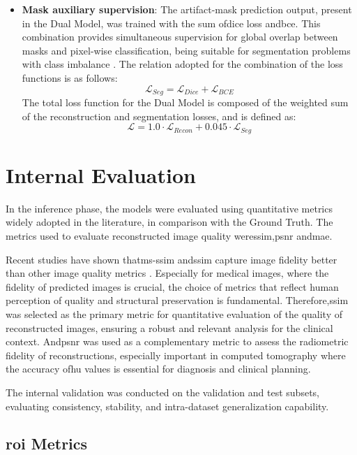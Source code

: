 \begin{itemize}
    \item \textbf{Mask auxiliary supervision}: The artifact-mask prediction output, present in the Dual Model, was trained with the sum of\acrfull{dice} loss and\acrfull{bce}. This combination provides simultaneous supervision for global overlap between masks and pixel-wise classification, being suitable for segmentation problems with class imbalance \cite{taghanakiComboLossHandling2021}.
     The relation adopted for the combination of the loss functions is as follows:
        \[
        \mathcal{L}_{Seg} = \mathcal{L}_{Dice} + \mathcal{L}_{BCE}
        \]
     The total loss function for the Dual Model is composed of the weighted sum of the reconstruction and segmentation losses, and is defined as:
        \[
        \mathcal{L} = 1{.}0 \cdot \mathcal{L}_{Recon} + 0{.}045 \cdot \mathcal{L}_{Seg}
        \]
\end{itemize}

\section{Internal Evaluation}
In the inference phase, the models were evaluated using quantitative metrics widely adopted in the literature, in comparison with the Ground Truth. The metrics used to evaluate reconstructed image quality were\acrshort{ssim},\acrshort{psnr} and\acrshort{mae}.

Recent studies have shown that\acrshort{ms-ssim} and\acrshort{ssim} capture image fidelity better than other image quality metrics \cite{linzhangFSIMFeatureSimilarity2011}. Especially for medical images, where the fidelity of predicted images is crucial, the choice of metrics that reflect human perception of quality and structural preservation is fundamental. Therefore,\acrshort{ssim} was selected as the primary metric for quantitative evaluation of the quality of reconstructed images, ensuring a robust and relevant analysis for the clinical context. And\acrshort{psnr} was used as a complementary metric to assess the radiometric fidelity of reconstructions, especially important in computed tomography where the accuracy of\acrshort{hu} values is essential for diagnosis and clinical planning.

The internal validation was conducted on the validation and test subsets, evaluating consistency, stability, and intra-dataset generalization capability.

\subsection{\acrshort{roi} Metrics}
\label{subsec:methods-roi}

